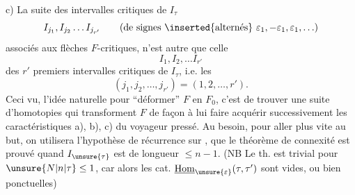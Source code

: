 c) La suite des intervalles critiques  de $I_\tau$
\[
I_{j_1},I_{j_2}\ldots I_{j_{r'}}\qquad(\text{de signes }\inserted{\text{alternés}}\ \varepsilon_1,-\varepsilon_1,\varepsilon_1,\ldots)
\]
associés aux flèches $F$-critiques, n'est autre que celle 
\[
I_1,I_2,\ldots I_{r'}
\]
des $r'$ premiers intervalles critiques de $I_\tau$, i.e. les
\[
(j_1,j_2,\ldots,j_{r'})=(1,2,\ldots,r').
\]
Ceci vu, l'idée naturelle pour ``déformer'' $F$ en $F_0$, c'est de trouver une suite d'homotopies qui transforment $F$ de façon à lui faire acquérir successivement les caractéristiques a), b), c) du voyageur pressé.  Au besoin, pour aller plus vite au but, on utilisera l'hypothèse de récurrence sur  , que le théorème  de connexité est  prouvé quand $I_{\unsure{\tau}}$ est de longueur  $\leq n-1$. (NB Le  th. est trivial pour $\unsure{N|n|\tau}\leq1$, car alors les cat. $\underline{\mathrm{Hom}}_{\unsure{\varepsilon}}(\tau,\tau')$ sont  vides, ou bien ponctuelles)


